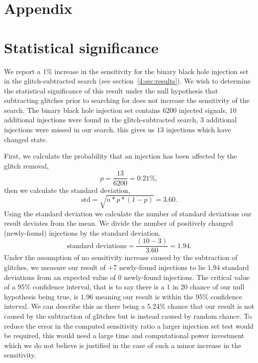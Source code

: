 \section*{Appendix}
\section{\label{4:sec:apdx_stat_sig}Statistical significance}

We report a $1\%$ increase in the sensitivity for the binary black hole injection set in the glitch-subtracted \gw{} search (see section~\ref{4:sec:results}). We wish to determine the statistical significance of this result under the null hypothesis that subtracting \scl{} glitches prior to searching for \gws{} does not increase the sensitivity of the \gw{} search. The binary black hole injection set contains $6200$ injected signals, $10$ additional injections were found in the glitch-subtracted \gw{} search, $3$ additional injections were missed in our search, this gives us $13$ injections which have changed state.

First, we calculate the probability that an injection has been affected by the glitch removal, 
%
\begin{equation}
    p = \frac{13}{6200} = 0.21\% ,
\end{equation}
%
then we calculate the standard deviation, 
%
\begin{equation}
    \textrm{std} = \sqrt{n * p * (1 - p)} = 3.60 .
\end{equation}
%
Using the standard deviation we calculate the number of standard deviations our result deviates from the mean. We divide the number of positively changed (newly-found) injections by the standard deviation, 
%
\begin{equation}
    \textrm{standard deviations} = \frac{(10 - 3)}{3.60} = 1.94 .
\end{equation}
%
Under the assumption of no sensitivity increase caused by the subtraction of glitches, we measure our result of +7 newly-found \gw{} injections to lie $1.94$ standard deviations from an expected value of $0$ newly-found injections. The critical value of a 95\% confidence interval, that is to say there is a 1 in 20 chance of our null hypothesis being true, is $1.96$ meaning our result is within the 95\% confidence interval. We can describe this as there being a 5.24\% chance that our result is not caused by the subtraction of glitches but is instead caused by random chance. To reduce the error in the computed sensitivity ratio a larger injection set test would be required, this would need a large time and computational power investment which we do not believe is justified in the case of such a minor increase in the sensitivity.

